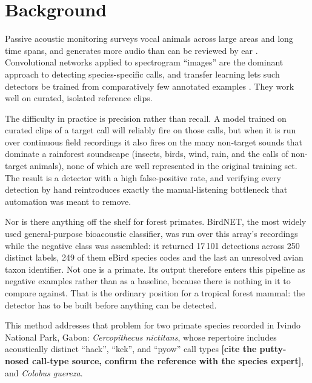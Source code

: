 \documentclass[review,3p,times]{elsarticle}
\begin{document}
\section*{Background}

Passive acoustic monitoring surveys vocal animals across large areas and long
time spans, and generates more audio than can be reviewed by ear
\cite{cauzinille2024}. Convolutional networks applied to spectrogram ``images''
are the dominant approach to detecting species-specific calls, and transfer
learning lets such detectors be trained from comparatively few annotated
examples \cite{sun2022}. They work well on curated, isolated reference clips.

The difficulty in practice is precision rather than recall. A model trained on
curated clips of a target call will reliably fire on those calls, but when it
is run over continuous field recordings it also fires on the many non-target
sounds that dominate a rainforest soundscape (insects, birds, wind, rain,
and the calls of non-target animals), none of which are well represented in
the original training set. The result is a detector with a high false-positive
rate, and verifying every detection by hand reintroduces exactly the
manual-listening bottleneck that automation was meant to remove.

Nor is there anything off the shelf for forest primates. BirdNET, the most widely
used general-purpose bioacoustic classifier, was run over this array's
recordings while the negative class was assembled: it returned 17\,101
detections across 250 distinct labels, 249 of them eBird species codes and the
last an unresolved avian taxon identifier. Not one is a primate. Its output
therefore enters this pipeline as negative examples rather than as a baseline,
because there is nothing in it to compare against. That is the ordinary
position for a tropical forest mammal: the detector has to be built before
anything can be detected.

This method addresses that problem for two primate species recorded in Ivindo
National Park, Gabon: \textit{Cercopithecus nictitans},
whose repertoire includes acoustically distinct ``hack'', ``kek'', and
``pyow'' call types \textbf{[cite the putty-nosed call-type source, confirm
the reference with the species expert]}, and \textit{Colobus guereza}.
\end{document}
